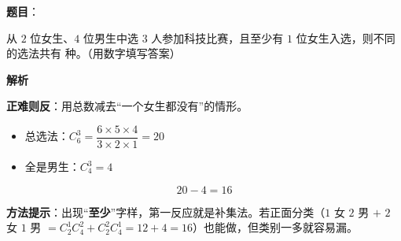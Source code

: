\begin{answer}

\textbf{题目}：

从 $2$ 位女生、$4$ 位男生中选 $3$ 人参加科技比赛，且至少有 $1$ 位女生入选，则不同的选法共有 \gkblank{} 种。（用数字填写答案）

\textbf{解析}

\textbf{正难则反}：用总数减去“一个女生都没有”的情形。

\begin{itemize}
\item 总选法：$C_6^{3}=\dfrac{6\times5\times4}{3\times2\times1}=20$
\item 全是男生：$C_4^{3}=4$
\end{itemize}

\nopagebreak[4]
\[20-4=16\]

\begin{gktip}
\textbf{方法提示}：出现“\textbf{至少}”字样，第一反应就是补集法。若正面分类（$1$ 女 $2$ 男 $+$ $2$ 女 $1$ 男 $=C_2^{1}C_4^{2}+C_2^{2}C_4^{1}=12+4=16$）也能做，但类别一多就容易漏。
\end{gktip}


\par\medskip

\end{answer}
